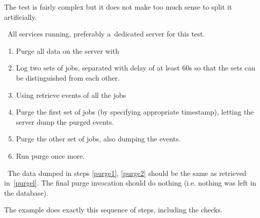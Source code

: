 The test is fairly complex but it does not make too much sense to split it
artificially.

\req\ All \LB services running, preferably a~dedicated server for this test.

\how
\begin{enumerate}
\item Purge all data on the server with 
\item Log two sets of jobs, separated with delay of at least 60s so
that the sets can be distinguished from each other.
\item \label{purgel}
Using  retrieve events of all the jobs
\item \label{purge1}
Purge the first set of jobs (by specifying appropriate timestamp),
letting the server dump the purged events.
\item \label{purge2} Purge the other set of jobs, also dumping the events.
\item \label{purge3} Run purge once more.
\end{enumerate}

\result\ The data dumped in steps \ref{purge1}, \ref{purge2} should be the
same as retrieved in~\ref{purgel}. The final purge invocation should
do nothing (i.e. nothing was left in the database).

\begin{hints}
The example  does exactly this sequence of steps,
including the checks.
\end{hints}
